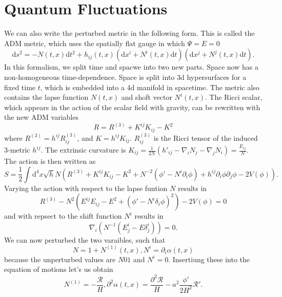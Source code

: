 \documentclass[12pt]{article}
\begin{document}
\section{Quantum Fluctuations}
We can also write the perturbed metric in the following form. This is called the ADM metric, which uses the spatially flat gauge in which $\Psi = E = 0$
\begin{equation}
    \mathrm{d}s^2 = -N(t,x)\mathrm{d}t^2 + h_{ij}(t,x)\left(\mathrm{d}x^i + N^i(t,x)\mathrm{d}t\right)\left(\mathrm{d}x^j + N^j(t,x)\mathrm{d}t\right).
\end{equation}
In this formalism, we split time and spacwe into two new parts. Space now has a non-homogeneous time-dependence. Space is split into 3d hypersurfaces for a fixed time $t$, which is embedded into a 4d manifold in spacetime. The metric also contains the lapse function $N(t,x)$ and shoft vector $N^i(t,x)$. The Ricci scalar, which appears in the action of the scalar field with gravity, can be rewritten with the new ADM variables
\begin{equation}
    R = R^{(3)} + K^{ij}K_{ij} - K^2
\end{equation}
where $R^{(3)} = h^{ij}R^{(3)}_{ij}$, and $K = h^{ij}K_{ij}$. $R^{(3)}_{ij}$ is the Ricci tensor of the induced 3-metric $h^{ij}$. The extrinsic curvature is $K_{ij} = \frac{1}{2N}(h'_{ij} - \nabla_i N_j - \nabla_j N_i)= \frac{E_{ij}}{N}$. The action is then written as 
\begin{equation}
    S = \frac{1}{2} \int \mathrm{d}^4x \sqrt{h}N \left(R^{(3)} + K^{ij}K_{ij} - K^2 + N^{-2}\left(\phi' - N^i \partial_i \phi\right)+h^{ij} \partial_i\phi\partial_j\phi - 2V(\phi)\right).
\end{equation}
Varying the action with respect to the lapse funtion $N$ results in 
\begin{equation}
    R^{(3)} - N^2(E^{ij}E_{ij} - E^2 + (\phi' - N^i \delta_i\phi)^2) - 2V(\phi) = 0
\end{equation}
and with repsect to the shift function $N^i$ results in 
\begin{equation}
    \nabla_i(N^{-1}(E^i_j - E \delta^i_j)) = 0.
\end{equation}
We can now perturbed the two varaibles, such that 
\begin{equation}
    N = 1 + N^{(1)}(t,x), N^i = \partial_i \alpha(t,x)
\end{equation}
because the unperturbed values are $N 0 1$ and $N^i = 0$. Insertiung these into the equation of motions let's us obtain 
\begin{equation}
    N^{(1)} = - \frac{\mathcal{R}}{H}, \partial^2\alpha(t,x) = \frac{\partial^2 \mathcal{R}}{H} - a^2 \frac{\phi'}{2H^2}\mathcal{R'}.
\end{equation}
\end{document}
